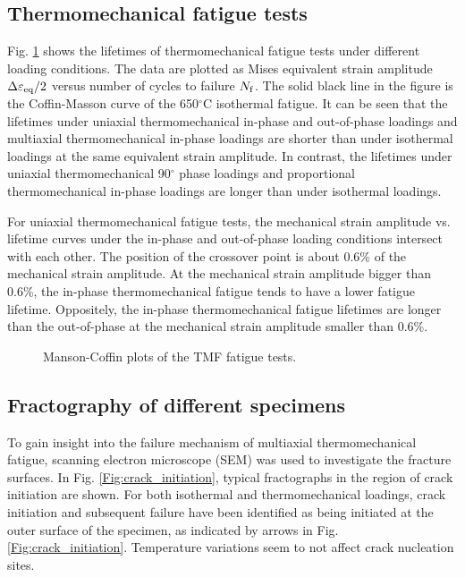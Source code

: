\documentclass[preprint,5p,twocolumn,11pt,sort&compress]{elsarticle}
\begin{document}
\subsection{Thermomechanical fatigue tests}

Fig. \ref{Fig:plot_exp_fatigue_life} shows the lifetimes of thermomechanical fatigue tests under different loading conditions. The data are plotted as Mises equivalent strain amplitude $\Delta\varepsilon_{\rm eq}/2$ versus number of cycles to failure $N_{\rm f}$. The solid black line in the figure is the Coffin-Masson curve of the 650$^\circ$C isothermal fatigue. It can be seen that the lifetimes under uniaxial thermomechanical in-phase and out-of-phase loadings and multiaxial thermomechanical in-phase loadings are shorter than under isothermal loadings at the same equivalent strain amplitude.
In contrast, the lifetimes under uniaxial thermomechanical 90$^\circ$ phase loadings and proportional thermomechanical in-phase loadings are longer than under isothermal loadings.

For uniaxial thermomechanical fatigue tests, the mechanical strain amplitude vs. lifetime curves under the in-phase and out-of-phase loading conditions intersect with each other. The position of the crossover point is about 0.6\% of the mechanical strain amplitude.
At the mechanical strain amplitude bigger than 0.6\%, the in-phase thermomechanical fatigue tends to have a lower fatigue lifetime. Oppositely, the in-phase thermomechanical fatigue lifetimes are longer than the out-of-phase at the mechanical strain amplitude smaller than 0.6\%.

\begin{figure}[t]
\caption{Manson-Coffin plots of the TMF fatigue tests.}
\label{Fig:plot_exp_fatigue_life}
\end{figure}

\subsection{Fractography of different specimens}


To gain insight into the failure mechanism of multiaxial thermomechanical fatigue, scanning electron microscope (SEM) was used to investigate the fracture surfaces. In Fig. \ref{Fig:crack_initiation}, typical fractographs in the region of crack initiation are shown. For both isothermal and thermomechanical loadings, crack initiation and subsequent failure have been identified as being initiated at the outer surface of the specimen, as indicated by arrows in Fig. \ref{Fig:crack_initiation}. Temperature variations seem to not affect crack nucleation sites.
\end{document}
